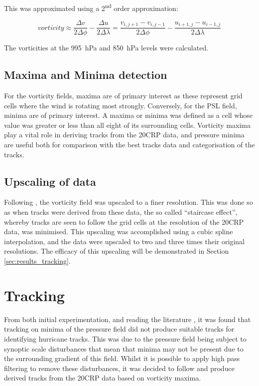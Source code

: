 \documentclass[pdftex,12pt,a4paper]{report}
\newcommand{\ts}{\textsuperscript}
\begin{document}
This was approximated using a 2\ts{nd} order approximation:

\begin{equation}
    vorticity \approx \frac{\Delta v}{2 \Delta \phi} - \frac{\Delta u}{2 \Delta \lambda} = \frac{v_{i,j+1} - v_{i,j-1}}{2 \Delta \phi} - \frac{u_{i+1,j} - u_{i-1,j}}{2 \Delta \lambda}
    \label{eqn:vorticity_2nd_order}
\end{equation}

The vorticities at the \SI{995}{hPa} and \SI{850}{hPa} levels were calculated.

\subsection{Maxima and Minima detection}
\label{sec:methods_maxima_minima}

For the vorticity fields, maxima are of primary interest as these represent grid cells where the wind is rotating most strongly. Conversely, for the PSL field, minima are of primary interest. A maxima or minima was defined as a cell whose value was greater or less than all eight of its surrounding cells. Vorticity maxima play a vital role in deriving tracks from the 20CRP data, and pressure minima are useful both for comparison with the best tracks data and categorisation of the tracks.

\subsection{Upscaling of data}

Following \textcite{TODOhodgesXXX}, the vorticity field was upscaled to a finer resolution. This was done so as when tracks were derived from these data, the so called ``staircase effect'', whereby tracks are seen to follow the grid cells at the resolution of the 20CRP data, was minimised. This upscaling was accomplished using a cubic spline interpolation, and the data were upscaled to two and three times their original resolutions. The efficacy of this upscaling will be demonstrated in Section \ref{sec:results_tracking}.

\section{Tracking}

From both initial experimentation, and reading the literature \parencite{TODOmultiple}, it was found that tracking on minima of the pressure field did not produce suitable tracks for identifying hurricane tracks. This was due to the pressure field being subject to synoptic scale disturbances that mean that minima may not be present due to the surrounding gradient of this field. Whilst it is possible to apply high pass filtering to remove these disturbances, it was decided to follow \textcite{TODOmutliple} and produce derived tracks from the 20CRP data based on vorticity maxima.
\end{document}
